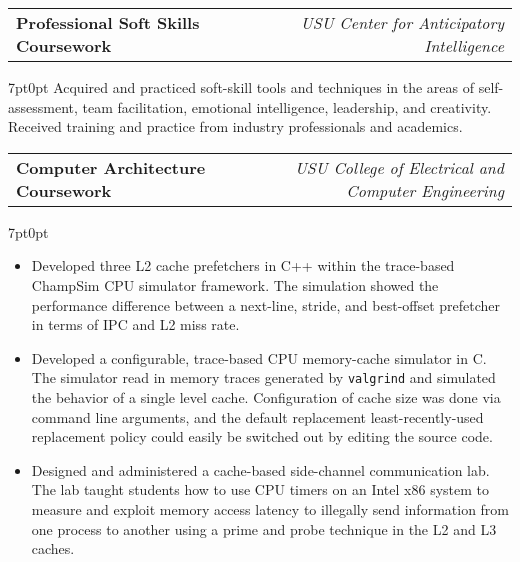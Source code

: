 \documentclass[letterpaper,12pt]{article}
\makeatletter
\newcommand{\simpleHeading}[2]{
    \vspace{-1pt}
    \begin{tabular*}{0.99\textwidth}[t]{l@{\extracolsep{\fill}}r}
        #1 & #2 \\
    \end{tabular*}
}
\newcommand{\positionHeading}[4]{
    \simpleHeading{\textbf{#1}}{\textit{#2}}
    \simpleHeading{\textit{#3}}{\textit{#4}}
}
\newcommand{\simpleParagraph}[1]{
    \vspace{-1pt}
    \begin{adjustwidth}{7pt}{0pt}
        #1
    \end{adjustwidth}
}
\makeatother
\begin{document}



    \vspace{10pt}
    \simpleHeading{\textbf{Professional Soft Skills Coursework}}{\textit{USU Center for Anticipatory Intelligence}}

    \simpleParagraph{Acquired and practiced soft-skill tools and techniques in the areas of self-assessment, team
    facilitation, emotional intelligence, leadership, and creativity. Received training and practice
    from industry professionals and academics.}
    
    \vspace{10pt}
    \simpleHeading{\textbf{Computer Architecture Coursework}}
                  {\textit{USU College of Electrical and Computer Engineering}}

    \simpleParagraph{
        \begin{itemize}
            \item Developed three L2 cache prefetchers in C++ within the trace-based ChampSim CPU
                simulator framework. The simulation showed the performance difference between a next-line, stride,
                and best-offset prefetcher in terms of IPC and L2 miss rate.

            \item Developed a configurable, trace-based CPU memory-cache simulator in C. The simulator
                read in memory traces generated by \texttt{valgrind} and simulated the behavior of a single 
                level cache. Configuration of cache size was done via command line arguments, and the default
                replacement least-recently-used replacement policy could easily be switched out by editing the 
                source code.

            \item Designed and administered a cache-based side-channel communication lab. The lab taught
                students how to use CPU timers on an Intel x86 system to measure and exploit memory access 
                latency to illegally send information from one process to another using a prime and probe 
                technique in the L2 and L3 caches.

        \end{itemize}
    }
\end{document}
